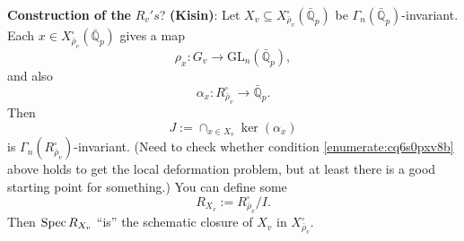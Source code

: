 \documentclass[reqno]{amsart} 
\numberwithin{theorem}{section}
\numberwithin{equation}{section}
\numberwithin{exercise}{section}
\begin{document}
\textbf{Construction of the} $R_v's$? \textbf{(Kisin)}: Let $X_v \subseteq X_{\bar{\rho}_v}^{\square}(\bar{\mathbb{Q}}_p)$ be $\Gamma_n(\bar{\mathbb{Q}}_p)$-invariant.  Each $x \in X_{\bar{\rho}_v}^{\square}(\bar{\mathbb{Q}}_p)$ gives a map
\begin{equation*}
  \rho_x : G_v \rightarrow \mathrm{GL}_n(\bar{\mathbb{Q}}_p),
\end{equation*}
and also
\begin{equation*}
  \alpha_x : R_{\bar{\rho}_v}^{\square} \rightarrow \bar{\mathbb{Q}}_p.
\end{equation*}
Then
\begin{equation*}
  J := \cap_{x \in X_v} \ker(\alpha_x)
\end{equation*}
is $\Gamma_n(R_{\bar{\rho}_v}^{\square})$-invariant.  (Need to check whether condition \eqref{enumerate:cq6s0pxv8b} above holds to get the local deformation problem, but at least there is a good starting point for something.)  You can define some
\begin{equation*}
  R_{X_v} := R_{\bar{\rho}_v}^{\square} / I.
\end{equation*}
Then $\operatorname{Spec} R_{X_v}$ ``is'' the schematic closure of $X_v$ in $X_{\bar{\rho}_v}^{\square}$.
\end{document}
